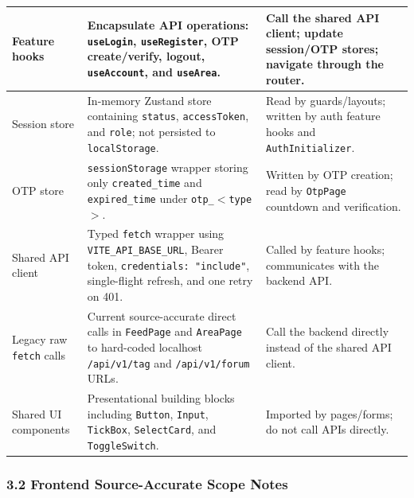 \documentclass[12pt]{article}
\begin{document}
\begin{longtable}{|>{\raggedright\arraybackslash}p{}|>{\raggedright\arraybackslash}p{}|>{\raggedright\arraybackslash}p{}|}
Feature hooks & Encapsulate API operations: \texttt{useLogin}, \texttt{useRegister}, OTP create/verify, logout, \texttt{useAccount}, and \texttt{useArea}. & Call the shared API client; update session/OTP stores; navigate through the router. \\ \hline
Session store & In-memory Zustand store containing \texttt{status}, \texttt{accessToken}, and \texttt{role}; not persisted to \texttt{localStorage}. & Read by guards/layouts; written by auth feature hooks and \texttt{AuthInitializer}. \\ \hline
OTP store & \texttt{sessionStorage} wrapper storing only \texttt{created\_time} and \texttt{expired\_time} under \texttt{otp\_$<$type$>$}. & Written by OTP creation; read by \texttt{OtpPage} countdown and verification. \\ \hline
Shared API client & Typed \texttt{fetch} wrapper using \texttt{VITE\_API\_BASE\_URL}, Bearer token, \texttt{credentials: "include"}, single-flight refresh, and one retry on 401. & Called by feature hooks; communicates with the backend API. \\ \hline
Legacy raw \texttt{fetch} calls & Current source-accurate direct calls in \texttt{FeedPage} and \texttt{AreaPage} to hard-coded localhost \texttt{/api/v1/tag} and \texttt{/api/v1/forum} URLs. & Call the backend directly instead of the shared API client. \\ \hline
Shared UI components & Presentational building blocks including \texttt{Button}, \texttt{Input}, \texttt{TickBox}, \texttt{SelectCard}, and \texttt{ToggleSwitch}. & Imported by pages/forms; do not call APIs directly. \\ \hline
\end{longtable}
\endgroup
\par\medskip

\hypertarget{sec:3-2-frontend-source-accurate-scope-notes}{}
\subsubsection*{3.2 Frontend Source-Accurate Scope Notes}
\par\medskip
\end{document}
